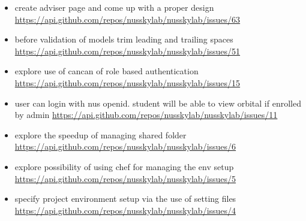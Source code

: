{\begin{itemize}[noitemsep]
    \item create adviser page and come up with a proper design \url{https://api.github.com/repos/nusskylab/nusskylab/issues/63} 
    \item before validation of models  trim leading and trailing spaces \url{https://api.github.com/repos/nusskylab/nusskylab/issues/51} 
    \item explore use of cancan of role based authentication \url{https://api.github.com/repos/nusskylab/nusskylab/issues/15} 
    \item user can login with nus openid. student will be able to view orbital if enrolled by admin \url{https://api.github.com/repos/nusskylab/nusskylab/issues/11} 
    \item explore the speedup of managing shared folder \url{https://api.github.com/repos/nusskylab/nusskylab/issues/6} 
    \item explore possibility of using chef for managing the env setup \url{https://api.github.com/repos/nusskylab/nusskylab/issues/5} 
    \item specify project environment setup via the use of setting files \url{https://api.github.com/repos/nusskylab/nusskylab/issues/4} 
\end{itemize}
}
